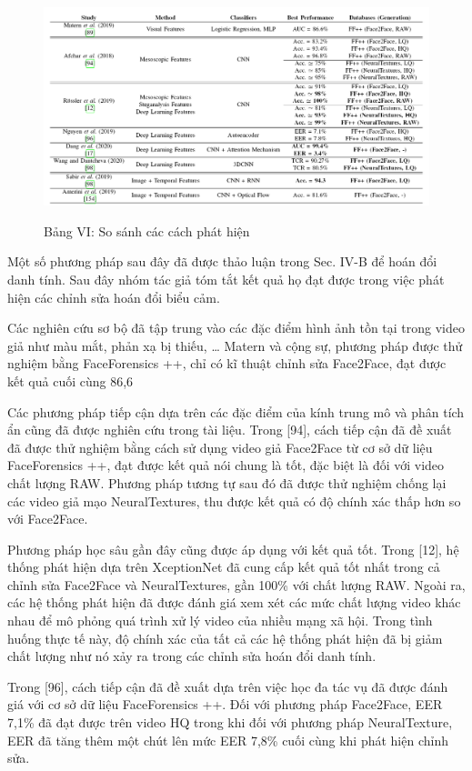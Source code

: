 \documentclass{article}
\begin{document}
\begin{figure}[h!]
\caption{Bảng VI: So sánh các cách phát hiện}
\includegraphics[width=\columnwidth]{table-6-compare}
\label{table-6-compare}
\end{figure}

Một số phương pháp sau đây đã được thảo luận trong Sec. IV-B để hoán đổi danh tính. Sau đây nhóm tác giả tóm tắt kết quả họ đạt được trong việc phát hiện các chỉnh sửa hoán đổi biểu cảm.

Các nghiên cứu sơ bộ đã tập trung vào các đặc điểm hình ảnh tồn tại trong video giả như màu mắt, phản xạ bị thiếu, … Matern và cộng sự, phương pháp được thử nghiệm bằng FaceForensics ++, chỉ có kĩ thuật chỉnh sửa Face2Face, đạt được kết quả cuối cùng 86,6%

Các phương pháp tiếp cận dựa trên các đặc điểm của kính trung mô và phân tích ẩn cũng đã được nghiên cứu trong tài liệu. Trong [94], cách tiếp cận đã đề xuất đã được thử nghiệm bằng cách sử dụng video giả Face2Face từ cơ sở dữ liệu FaceForensics ++, đạt được kết quả nói chung là tốt, đặc biệt là đối với video chất lượng RAW. Phương pháp tương tự sau đó đã được thử nghiệm chống lại các video giả mạo NeuralTextures, thu được kết quả có độ chính xác thấp hơn so với Face2Face.

Phương pháp học sâu gần đây cũng được áp dụng với kết quả tốt. Trong [12], hệ thống phát hiện dựa trên XceptionNet đã cung cấp kết quả tốt nhất trong cả chỉnh sửa Face2Face và NeuralTextures, gần 100\% với chất lượng RAW. Ngoài ra, các hệ thống phát hiện đã được đánh giá xem xét các mức chất lượng video khác nhau để mô phỏng quá trình xử lý video của nhiều mạng xã hội. Trong tình huống thực tế này, độ chính xác của tất cả các hệ thống phát hiện đã bị giảm chất lượng như nó xảy ra trong các chỉnh sửa hoán đổi danh tính.

Trong [96], cách tiếp cận đã đề xuất dựa trên việc học đa tác vụ đã được đánh giá với cơ sở dữ liệu FaceForensics ++. Đối với phương pháp Face2Face, EER 7,1\% đã đạt được trên video HQ trong khi đối với phương pháp NeuralTexture, EER đã tăng thêm một chút lên mức EER 7,8\% cuối cùng khi phát hiện chỉnh sửa.
\end{document}

